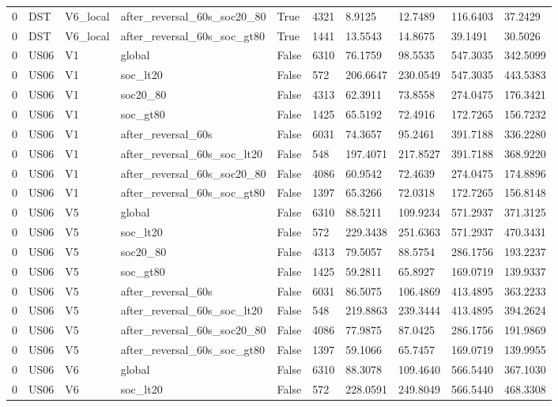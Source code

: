 \begin{tabular}{llllllllll}
0 & DST & V6\_local & after\_reversal\_60s\_soc20\_80 & True & 4321 & 8.9125 & 12.7489 & 116.6403 & 37.2429 \\
0 & DST & V6\_local & after\_reversal\_60s\_soc\_gt80 & True & 1441 & 13.5543 & 14.8675 & 39.1491 & 30.5026 \\
0 & US06 & V1 & global & False & 6310 & 76.1759 & 98.5535 & 547.3035 & 342.5099 \\
0 & US06 & V1 & soc\_lt20 & False & 572 & 206.6647 & 230.0549 & 547.3035 & 443.5383 \\
0 & US06 & V1 & soc20\_80 & False & 4313 & 62.3911 & 73.8558 & 274.0475 & 176.3421 \\
0 & US06 & V1 & soc\_gt80 & False & 1425 & 65.5192 & 72.4916 & 172.7265 & 156.7232 \\
0 & US06 & V1 & after\_reversal\_60s & False & 6031 & 74.3657 & 95.2461 & 391.7188 & 336.2280 \\
0 & US06 & V1 & after\_reversal\_60s\_soc\_lt20 & False & 548 & 197.4071 & 217.8527 & 391.7188 & 368.9220 \\
0 & US06 & V1 & after\_reversal\_60s\_soc20\_80 & False & 4086 & 60.9542 & 72.4639 & 274.0475 & 174.8896 \\
0 & US06 & V1 & after\_reversal\_60s\_soc\_gt80 & False & 1397 & 65.3266 & 72.0318 & 172.7265 & 156.8148 \\
0 & US06 & V5 & global & False & 6310 & 88.5211 & 109.9234 & 571.2937 & 371.3125 \\
0 & US06 & V5 & soc\_lt20 & False & 572 & 229.3438 & 251.6363 & 571.2937 & 470.3431 \\
0 & US06 & V5 & soc20\_80 & False & 4313 & 79.5057 & 88.5754 & 286.1756 & 193.2237 \\
0 & US06 & V5 & soc\_gt80 & False & 1425 & 59.2811 & 65.8927 & 169.0719 & 139.9337 \\
0 & US06 & V5 & after\_reversal\_60s & False & 6031 & 86.5075 & 106.4869 & 413.4895 & 363.2233 \\
0 & US06 & V5 & after\_reversal\_60s\_soc\_lt20 & False & 548 & 219.8863 & 239.3444 & 413.4895 & 394.2624 \\
0 & US06 & V5 & after\_reversal\_60s\_soc20\_80 & False & 4086 & 77.9875 & 87.0425 & 286.1756 & 191.9869 \\
0 & US06 & V5 & after\_reversal\_60s\_soc\_gt80 & False & 1397 & 59.1066 & 65.7457 & 169.0719 & 139.9955 \\
0 & US06 & V6 & global & False & 6310 & 88.3078 & 109.4640 & 566.5440 & 367.1030 \\
0 & US06 & V6 & soc\_lt20 & False & 572 & 228.0591 & 249.8049 & 566.5440 & 468.3308 \\

\end{tabular}
